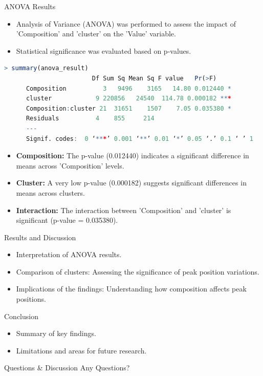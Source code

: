 \documentclass[aspectratio=169]{beamer}
\begin{document}
\begin{frame}[fragile]{ANOVA Results}
    \begin{itemize}
        \item Analysis of Variance (ANOVA) was performed to assess the impact of 'Composition' and 'cluster' on the 'Value' variable.
        \item Statistical significance was evaluated based on p-values.
    \end{itemize}

    \begin{lstlisting}[language=R, basicstyle=\tiny\ttfamily]
    > summary(anova_result)
                        Df Sum Sq Mean Sq F value   Pr(>F)    
      Composition          3   9496    3165   14.80 0.012440 *  
      cluster            9 220856   24540  114.78 0.000182 ***
      Composition:cluster 21  31651    1507    7.05 0.035380 *  
      Residuals          4    855     214                     
      ---
      Signif. codes:  0 ‘***’ 0.001 ‘**’ 0.01 ‘*’ 0.05 ‘.’ 0.1 ‘ ’ 1   
\end{lstlisting}

    \begin{itemize}
        \item \textbf{Composition:} The p-value (0.012440) indicates a significant difference in means across 'Composition' levels.
        \item \textbf{Cluster:} A very low p-value (0.000182) suggests significant differences in means across clusters.
        \item \textbf{Interaction:} The interaction between 'Composition' and 'cluster' is significant (p-value = 0.035380).
    \end{itemize}
\end{frame}



\begin{frame}{Results and Discussion}
    \begin{itemize}
        \item Interpretation of ANOVA results.
        \item Comparison of clusters: Assessing the significance of peak position variations.
        \item Implications of the findings: Understanding how composition affects peak positions.
    \end{itemize}
\end{frame}

\begin{frame}{Conclusion}
    \begin{itemize}
        \item Summary of key findings.
        \item Limitations and areas for future research.
    \end{itemize}
\end{frame}

\begin{frame}{Questions \& Discussion}
    \centering
    \Huge Any Questions?
\end{frame}
\end{document}
